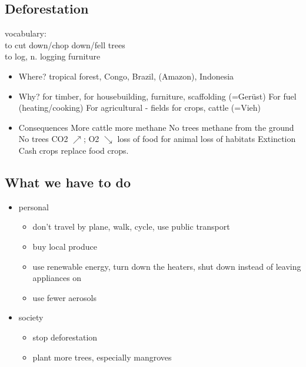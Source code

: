 \documentclass[a5paper,12pt,twoside,titlepage]{scrartcl}
\begin{document}
		
\subsection{Deforestation}
		vocabulary:\\ to cut down/chop down/fell trees\\to log, n. logging \textrightarrow furniture
		\begin{itemize}
		\item Where?
		\subitem tropical forest, Congo, Brazil, (Amazon), Indonesia
		\item Why? 
		\subitem for timber, for housebuilding, furniture, scaffolding (=Gerüst)
		\subitem For fuel (heating/cooking)
		\subitem For agricultural - fields for crops, cattle (=Vieh)
		\item Consequences
		\subitem More cattle \textrightarrow more methane
		\subitem No trees \textrightarrow methane from the ground
		\subitem No trees \textrightarrow CO2 $ \nearrow $; O2 $ \searrow $
		\subitem loss of food for animal
		\subitem loss of habitats \textrightarrow Extinction
		\subitem Cash crops replace food crops. 
		\end{itemize}
\subsection{What we have to do}
\begin{itemize}
	\item personal
	\begin{itemize}
		\item don't travel by plane, walk, cycle, use public transport
		\item buy local produce
		\item use renewable energy, turn down the heaters, shut down instead of leaving appliances on
		\item use fewer aerosols
	\end{itemize}
	\item society
	\begin{itemize}
		\item stop deforestation
		\item plant more trees, especially mangroves 
	\end{itemize}	
\end{itemize}
	
\end{document}
